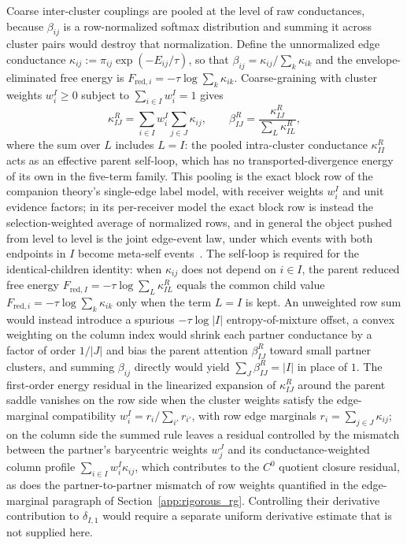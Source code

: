 \documentclass[11pt]{article}
\begin{document}
Coarse inter-cluster couplings are pooled at the level of raw conductances, because $\beta_{ij}$ is a row-normalized softmax distribution and summing it across cluster pairs would destroy that normalization. Define the unnormalized edge conductance $\kappa_{ij} := \pi_{ij}\exp(-E_{ij}/\tau)$, so that $\beta_{ij} = \kappa_{ij}/\sum_k \kappa_{ik}$ and the envelope-eliminated free energy is $F_{\mathrm{red},i} = -\tau \log \sum_k \kappa_{ik}$. Coarse-graining with cluster weights $w_i^I \ge 0$ subject to $\sum_{i \in I} w_i^I = 1$ gives
\begin{equation}
\kappa_{IJ}^R = \sum_{i \in I} w_i^I \sum_{j \in J} \kappa_{ij}, \qquad \beta_{IJ}^R = \frac{\kappa_{IJ}^R}{\sum_L \kappa_{IL}^R},
\label{eq:rg_inter_cluster}
\end{equation}
where the sum over $L$ includes $L=I$: the pooled intra-cluster conductance $\kappa_{II}^R$ acts as an effective parent self-loop, which has no transported-divergence energy of its own in the five-term family. This pooling is the exact block row of the companion theory's single-edge label model, with receiver weights $w_i^I$ and unit evidence factors; in its per-receiver model the exact block row is instead the selection-weighted average of normalized rows, and in general the object pushed from level to level is the joint edge-event law, under which events with both endpoints in $I$ become meta-self events~\cite[Ch.~11]{DennisGaugeVFE2026}. The self-loop is required for the identical-children identity: when $\kappa_{ij}$ does not depend on $i \in I$, the parent reduced free energy $F_{\mathrm{red},I} = -\tau \log \sum_L \kappa_{IL}^R$ equals the common child value $F_{\mathrm{red},i} = -\tau \log \sum_k \kappa_{ik}$ only when the term $L=I$ is kept. An unweighted row sum would instead introduce a spurious $-\tau \log |I|$ entropy-of-mixture offset, a convex weighting on the column index would shrink each partner conductance by a factor of order $1/|J|$ and bias the parent attention $\beta_{IJ}^R$ toward small partner clusters, and summing $\beta_{ij}$ directly would yield $\sum_J \beta_{IJ}^R = |I|$ in place of $1$. The first-order energy residual in the linearized expansion of $\kappa_{IJ}^R$ around the parent saddle vanishes on the row side when the cluster weights satisfy the edge-marginal compatibility $w_i^I = r_i/\sum_{i'} r_{i'}$, with row edge marginals $r_i = \sum_{j \in J} \kappa_{ij}$; on the column side the summed rule leaves a residual controlled by the mismatch between the partner's barycentric weights $w_j^J$ and its conductance-weighted column profile $\sum_{i \in I} w_i^I \kappa_{ij}$, which contributes to the $C^0$ quotient closure residual, as does the partner-to-partner mismatch of row weights quantified in the edge-marginal paragraph of Section~\ref{app:rigorous_rg}. Controlling their derivative contribution to $\delta_{I,1}$ would require a separate uniform derivative estimate that is not supplied here.
\end{document}
